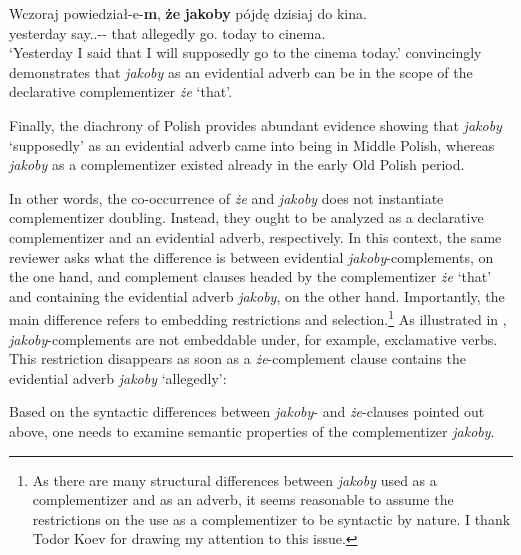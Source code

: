 \documentclass[output=paper]{langsci/langscibook}
\begin{document}
\ea  \label{plecak} \gll Wczoraj powiedział-e-\textbf{m}, \textbf{że} \textbf{jakoby} pójdę dzisiaj do kina.\\
  		yesterday say.{\lptcp}.{\sg}-{\masc}-{\firstperson}{\sg} that allegedly go.{\firstperson}{\sg} today to cinema.{\gen}\\
\glt	`Yesterday I said that  I will supposedly go to the cinema today.'
\z
{} convincingly demonstrates that \emph{jakoby} as an evidential adverb can be in the scope of the declarative complementizer \emph{że} `that'.

Finally, the diachrony of Polish provides abundant evidence showing that \emph{jakoby} `supposedly' as an evidential adverb came into being in Middle Polish, whereas \emph{jakoby} as a complementizer existed already in the early Old Polish period.

In other words, the co-occurrence of \emph{że} and \emph{jakoby} does not instantiate complementizer doubling. Instead, they ought to be analyzed as a declarative complementizer and an evidential adverb, respectively. In this context, the same reviewer asks what the difference is between evidential \emph{jakoby}-complements, on the one hand, and complement clauses headed by the complementizer \emph{że} `that' and containing the evidential adverb \emph{jakoby}, on the other hand. Importantly, the main difference refers to embedding restrictions and selection.\footnote{As there are many structural differences between \emph{jakoby} used as a complementizer and as an adverb, it seems reasonable to assume the restrictions on the use as a complementizer to be syntactic by nature. I thank Todor Koev for drawing my attention to this issue.
}
As illustrated in , \emph{jakoby}-complements are not embeddable under, for example, exclamative verbs. This restriction disappears as soon as a \emph{że}-complement clause contains the evidential adverb \emph{jakoby}  `allegedly':

\ea {}
\z\z
Based on the syntactic differences between \emph{jakoby}- and \emph{że}-clauses pointed out above, one needs to examine semantic properties of the complementizer \emph{jakoby}.
\end{document}
